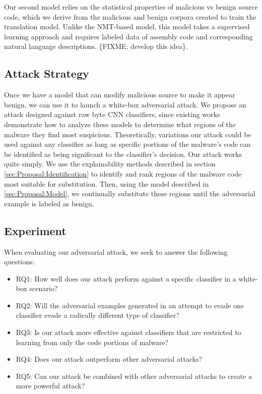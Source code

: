 \documentclass[conference]{IEEEtran}
\begin{document}
Our second model relies on the statistical properties of malicious vs benign source code, which we derive from the malicious and benign corpora created to train the translation model. Unlike the NMT-based model, this model takes a supervised learning approach and requires labeled data of assembly code and corresponding natural language descriptions. \{FIXME: develop this idea\}. 

\subsection{Attack Strategy}
\label{sec:Proposal:Attack}

Once we have a model that can modify malicious source to make it appear benign, we can use it to launch a white-box adversarial attack. We propose an attack designed against raw byte CNN classifiers, since existing works demonstrate how to analyze these models to determine what regions of the malware they find most suspicious. Theoretically, variations our attack could be used against any classifier as long as specific portions of the malware's code can be identified as being significant to the classifier's decision. Our attack works quite simply. We use the explainability methods described in section \ref{sec:Proposal:Identification} to identify and rank regions of the malware code most suitable for substitution. Then, using the model described in \ref{sec:Proposal:Model}, we continually substitute these regions until the adversarial example is labeled as benign.

\subsection{Experiment}
\label{sec:Proposal:Experiment}

When evaluating our adversarial attack, we seek to answer the following questions:
\begin{itemize}
	\item RQ1: How well does our attack perform against a specific classifier in a white-box scenario?
	\item RQ2: Will the adversarial examples generated in an attempt to evade one classifier evade a radically different type of classifier?
	\item RQ3: Is our attack more effective against classifiers that are restricted to learning from only the code portions of malware?
	\item RQ4: Does our attack outperform other adversarial attacks?
	\item RQ5: Can our attack be combined with other adversarial attacks to create a more powerful attack?
\end{itemize}
\end{document}
